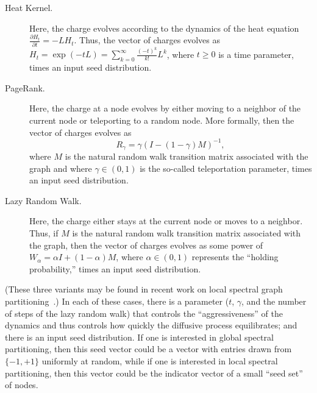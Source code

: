 \documentclass[12pt]{article}
\theoremstyle{plain}
\begin{document}
\begin{description}
  \item[Heat Kernel.]
    Here, the charge evolves according to the dynamics of the heat equation
    $\frac{\partial H_t}{\partial t} = - L H_t$.
    Thus, the vector of charges evolves as
$     H_t = \exp ( -tL )  = \sum_{k=0}^{\infty} \frac{(-t)^k}{k!}L^k  $,
    where $t \ge 0$ is a time parameter, times an input seed distribution.
  \item[PageRank.]
    Here, the charge at a node evolves by either moving to a neighbor of 
    the current node or teleporting to a random node.
    More formally, then the vector of charges evolves as 
    \begin{equation}
    \label{eqn:page-rank}
    R_{\gamma} = \gamma \left(I-\left(1-\gamma \right)M \right)^{-1}   ,
    \end{equation}
    where $M$ is the natural random walk transition matrix associated 
    with the graph and
    where $\gamma \in (0,1)$ is the so-called teleportation parameter,
    times an input seed distribution.
  \item[Lazy Random Walk.]
    Here, the charge either stays at the current node or moves to a neighbor.
    Thus, if $M$ is the natural random walk transition matrix associated 
    with the graph, then the vector of charges evolves as some power of 
$     W_{\alpha}= \alpha I + (1-\alpha)M $,
    where $\alpha \in (0,1)$ represents the ``holding probability,'' times 
    an input seed distribution.
\end{description}
(These three variants may be found in recent work on local spectral graph 
partitioning~\cite{Spielman:2004,andersen06local,Chung07_heatkernelPNAS}.)
In each of these cases, there is a parameter ($t$, $\gamma$, and the number 
of steps of the lazy random walk) that controls the ``aggressiveness'' of 
the dynamics and thus controls how quickly the diffusive process 
equilibrates; and there is an input seed distribution.
If one is interested in global spectral partitioning, then this seed vector 
could be a vector with entries drawn from $\{-1,+1\}$ uniformly at random, 
while if one is interested in local spectral partitioning, then this vector 
could be the indicator vector of a small ``seed set'' of nodes.
\end{document}
